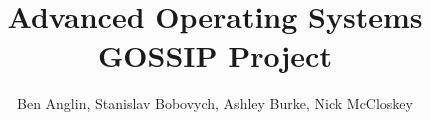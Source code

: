 \documentclass[a4paper,12pt]{article}
\begin{document}
\title{Advanced Operating Systems GOSSIP Project}
\author{Ben Anglin, Stanislav Bobovych, Ashley Burke, Nick McCloskey}
\maketitle

\graphicspath{{./images/}}

%

%



%


%
%
\end{document}
